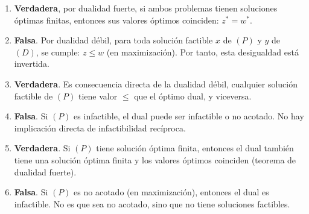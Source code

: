\begin{enumerate}
\item[(a)]
\textbf{Verdadera}, por dualidad fuerte, si ambos problemas tienen soluciones óptimas finitas, entonces sus valores óptimos coinciden: $z^* = w^*$.

\item[(b)]
\textbf{Falsa}. Por dualidad débil, para toda solución factible $x$ de $(P)$ y $y$ de $(D)$, se cumple: $z \leq w$ (en maximización). Por tanto, esta desigualdad está invertida.

\item[(c)]
\textbf{Verdadera}. Es consecuencia directa de la dualidad débil, cualquier solución factible de $(P)$ tiene valor $\leq$ que el óptimo dual, y viceversa.

\item[(d)]
\textbf{Falsa}. Si $(P)$ es infactible, el dual puede ser infactible o no acotado. No hay implicación directa de infactibilidad recíproca.

\item[(e)]
\textbf{Verdadera}. Si $(P)$ tiene solución óptima finita, entonces el dual también tiene una solución óptima finita y los valores óptimos coinciden (teorema de dualidad fuerte).

\item[(f)]
\textbf{Falsa}. Si $(P)$ es no acotado (en maximización), entonces el dual es infactible. No es que sea no acotado, sino que no tiene soluciones factibles.
\end{enumerate}
